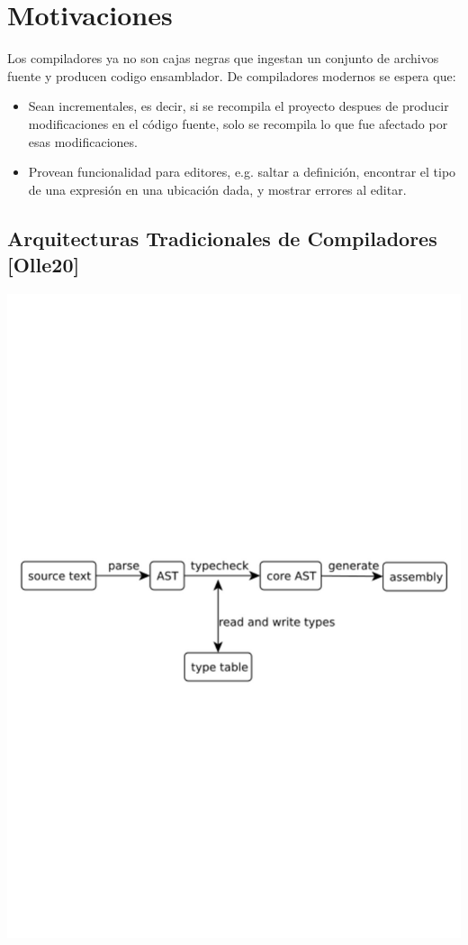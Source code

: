 \documentclass[12pt, a4paper]{report}
\begin{document}
\chapter*{Motivaciones}

Los compiladores ya no son cajas negras que ingestan un conjunto de archivos
fuente y producen codigo ensamblador. De compiladores modernos se espera que:

\begin{itemize}[noitemsep]

\item Sean incrementales, es decir, si se recompila el proyecto despues de
producir modificaciones en el código fuente, solo se recompila lo que fue
afectado por esas modificaciones.

\item Provean funcionalidad para editores, e.g. saltar a definición, encontrar
el tipo de una expresión en una ubicación dada, y mostrar errores al editar.

\end{itemize}

\section*{Arquitecturas Tradicionales de Compiladores [Olle20]}

\noindent
\includegraphics[width=\textwidth]{olle_trad_comp_arq}
\cite{olle_query_based}
\end{document}
